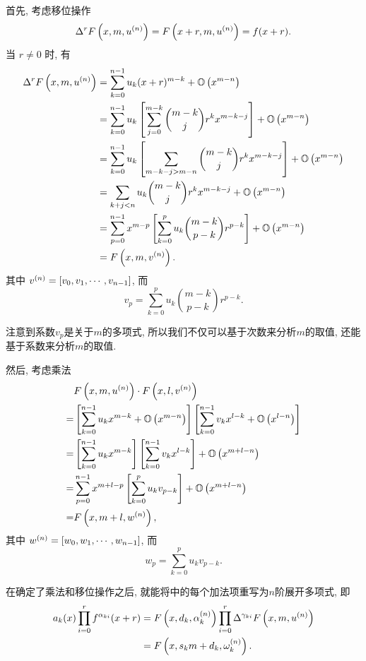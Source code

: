 首先, 考虑移位操作
\begin{equation}
\Delta^r F\left(x,m,u^{(n)}\right) = F\left(x+r,m,u^{(n)}\right) = f(x+r).
\end{equation}
当 $r\neq 0$ 时, 有 
\begin{equation}
\begin{split}
\Delta^r F\left(x,m,u^{(n)}\right) &= \sum_{k=0}^{n-1}{u_k (x+r)^{m-k}}+\mathbb O\left(x^{m-n}\right) \\
&= \sum_{k=0}^{n-1}{u_k \left[\sum_{j=0}^{m-k}{\binom{m-k}{j}r^kx^{m-k-j}}\right]}+\mathbb O\left(x^{m-n}\right) \\
&= \sum_{k=0}^{n-1}{u_k \left[\sum_{m-k-j>m-n}{\binom{m-k}{j}r^kx^{m-k-j}}\right]}+\mathbb O\left(x^{m-n}\right) \\
&= \sum_{k+j<n}{u_k {\binom{m-k}{j}r^kx^{m-k-j}}}+\mathbb O\left(x^{m-n}\right) \\
&=\sum_{p=0}^{n-1}{x^{m-p}\left[\sum_{k=0}^p{u_k\binom{m-k}{p-k}r^{p-k}}\right]}+\mathbb O\left(x^{m-n}\right)\\
&=F\left(x,m,v^{(n)}\right).
\end{split} \label{NEM-shift}
\end{equation}
其中 $v^{(n)}=\left[v_0,v_1,\cdots,v_{n-1}\right]$, 而
\begin{equation}
v_p=\sum_{k=0}^p{u_k\binom{m-k}{p-k}r^{p-k}}.
\end{equation}

注意到系数$v_p$是关于$m$的多项式, 所以我们不仅可以基于次数来分析$m$的取值, 还能基于系数来分析$m$的取值. 

然后, 考虑乘法 
\begin{equation}
\begin{split}
& F\left(x,m,u ^{(n)}\right)\cdot F\left(x,l,v^{(n)}\right) \\
=& \left[\sum_{k=0}^{n-1}{u_k x^{m-k}}+\mathbb O\left(x^{m-n}\right)\right]\left[\sum_{k=0}^{n-1}{v_k x^{l-k}}+\mathbb O\left(x^{l-n}\right)\right] \\
=& \left[\sum_{k=0}^{n-1}{u_k x^{m-k}}\right]\left[\sum_{k=0}^{n-1}{v_k x^{l-k}}\right]+\mathbb O\left(x^{m+l-n}\right) \\
=& \sum_{p=0}^{n-1}{x^{m+l-p}\left[\sum_{k=0}^p{u_k v_{p-k}}\right]}+\mathbb O\left(x^{m+l-n}\right) \\
=& F\left(x,m+l,w^{(n)}\right) ,
\end{split} \label{NEM-times}
\end{equation}
其中 $w^{(n)}=\left[w_0,w_1,\cdots,w_{n-1}\right]$, 而
\begin{equation}
w_p=\sum_{k=0}^p{u_k v_{p-k}}.
\end{equation}

在确定了乘法和移位操作之后, 就能将中的每个加法项重写为$n$阶展开多项式, 即
\begin{equation}
\begin{split}
a_k(x)\prod_{i=0}^r{f^{\alpha_{ki}}(x+r)}&=F\left(x,d_k,\alpha_k^{(n)}\right)\prod_{i=0}^r{\Delta^{\gamma_{ki}}F\left(x,m,u^{(n)}\right)} \\
&= F\left(x,s_k m+d_k, \omega_k^{(n)}\right) .
\end{split}
\end{equation}

